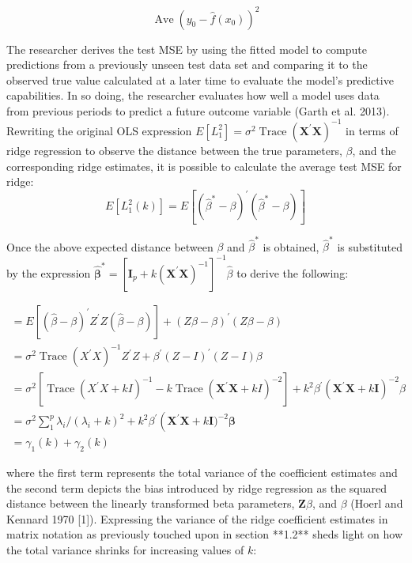 $$
\operatorname{Ave}\left(y_{0}-\hat{f}\left(x_{0}\right)\right)^{2}
$$

\noindent The researcher derives the test MSE by using the fitted model to compute predictions from a previously unseen test data set and comparing it to the observed true value calculated at a later time to evaluate the model’s predictive capabilities. In so doing, the researcher evaluates how well a model uses data from previous periods to predict a future outcome variable (Garth et al. 2013).
	Rewriting the original OLS expression $E\left[L_{1}^{2}\right]=\sigma^{2} \operatorname{Trace}\left(\mathbf{X}^{\prime} \mathbf{X}\right)^{-1}$ in terms of ridge regression to observe the distance between the true parameters, $\beta$, and the corresponding ridge  estimates, it is possible to calculate the average test MSE for ridge:
$$
E\left[L_{1}^{2}(k)\right]=E\left[\left(\hat{\beta}^{*}-\beta\right)^{\prime}\left(\hat{\beta}^{*}-\beta\right)\right]
$$

\noindent Once the above expected distance between $\beta$ and $\hat{\beta}^{*}$ is obtained, $\hat{\beta}^{*}$ is substituted by the expression $\hat{\boldsymbol{\beta}}^{*}=\left[\mathbf{I}_{p}+k\left(\mathbf{X}^{\prime} \mathbf{X}\right)^{-1}\right]^{-1} \hat{\beta}$ to derive the following: 

$$
\begin{array}{l}
=E\left[(\hat{\beta}-\beta)^{\prime} Z^{\prime} Z(\hat{\beta}-\beta)\right]+(Z \beta-\beta)^{\prime}(Z \beta-\beta) \\
=\sigma^{2} \operatorname{Trace}\left(X^{\prime} X\right)^{-1} Z^{\prime} Z+\beta^{\prime}(Z-I)^{\prime}(Z-I) \beta \\
=\sigma^{2}\left[\operatorname{Trace}\left(X^{\prime} X+k I\right)^{-1}-k \operatorname{Trace}\left(\mathbf{X}^{\prime} \mathbf{X}+k I\right)^{-2}\right]+k^{2} \beta^{\prime}\left(\mathbf{X}^{\prime} \mathbf{X}+k \mathbf{I}\right)^{-2} \mathcal{\beta}\\
=\sigma^{2} \sum_{1}^{p} \lambda_{i} /\left(\lambda_{i}+k\right)^{2}+k^{2} \beta^{\prime}\left(\mathbf{X}^{\prime} \mathbf{X}+k \mathbf{I})^{-2} \boldsymbol{\beta}\right. \\
=\gamma_{1}(k)+\gamma_{2}(k)
\end{array}
$$

\noindent where the first term represents the total variance of the coefficient estimates and the second term depicts the bias introduced by ridge regression as the squared distance between the linearly transformed beta parameters, $\mathbf Z \beta$, and $\beta$ (Hoerl and Kennard 1970 [1]). Expressing the variance of the ridge coefficient estimates in matrix notation as previously touched upon in section **1.2** sheds light on how the total variance shrinks for increasing values of $k$: 

